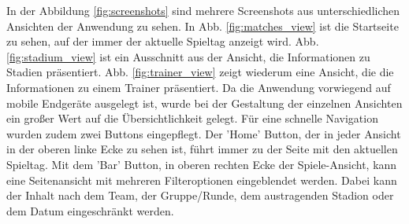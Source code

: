 \documentclass[runningheads,a4paper]{llncs}
\begin{document}
In der Abbildung \ref{fig:screenshots} sind mehrere Screenshots aus unterschiedlichen Ansichten der Anwendung zu sehen. In Abb. \ref{fig:matches_view} ist die Startseite zu sehen, auf der immer der aktuelle Spieltag anzeigt wird. Abb. \ref{fig:stadium_view} ist ein Ausschnitt aus der Ansicht, die Informationen zu Stadien präsentiert. Abb. \ref{fig:trainer_view} zeigt wiederum eine Ansicht, die die Informationen zu einem Trainer präsentiert. Da die Anwendung vorwiegend auf mobile Endgeräte ausgelegt ist, wurde bei der Gestaltung der einzelnen Ansichten ein großer Wert auf die Übersichtlichkeit gelegt. Für eine schnelle Navigation wurden zudem zwei Buttons eingepflegt. Der 'Home' Button, der in jeder Ansicht in der oberen linke Ecke zu sehen ist, führt immer zu der Seite mit den aktuellen Spieltag. Mit dem 'Bar' Button, in oberen rechten Ecke der Spiele-Ansicht, kann eine Seitenansicht mit mehreren Filteroptionen eingeblendet werden. Dabei kann der Inhalt nach dem Team, der Gruppe/Runde, dem austragenden Stadion oder dem Datum eingeschränkt werden.
\end{document}
